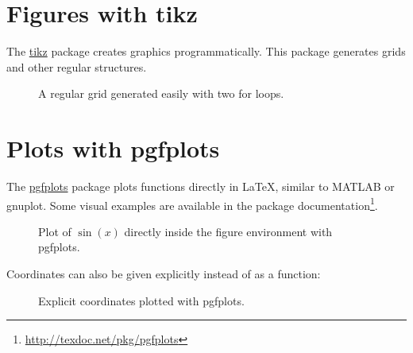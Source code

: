 \section{Figures with tikz}

The \href{https://ctan.org/pkg/pgf}{tikz} package creates graphics programmatically.
This package generates grids and other regular structures.

\begin{ltgexample}
\begin{figure}[ht]
  \centering
  \caption{A regular grid generated easily with two for loops.}\label{fig:tikz_example}
\end{figure}
\end{ltgexample}

\section{Plots with pgfplots}

The \href{https://ctan.org/pkg/pgfplots}{pgfplots} package plots functions directly in \LaTeX{}, similar to MATLAB or gnuplot.
Some visual examples are available in the package documentation\footnote{\url{http://texdoc.net/pkg/pgfplots}}.

\begin{ltgexample}
\begin{figure}[ht]
  \centering
  \caption{Plot of $\sin(x)$ directly inside the figure environment with pgfplots.}
  \label{fig:pgfplots_example}
\end{figure}
\end{ltgexample}

Coordinates can also be given explicitly instead of as a function:
\begin{ltgexample}
\begin{figure}[ht]
  \centering
  \caption{Explicit coordinates plotted with pgfplots.}
  \label{fig:pgfplots_coords}
\end{figure}
\end{ltgexample}

